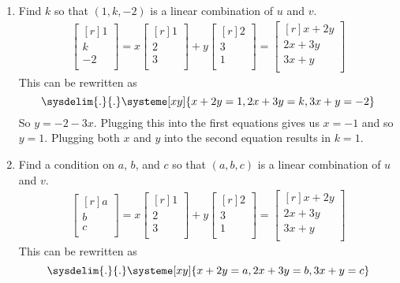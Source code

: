 \documentclass[12pt]{article}
\begin{document}
\begin{enumerate}
\begin{enumerate}
	\item Find $k$ so that $(1,k,-2)$ is a linear combination of $u$ and $v$.
		\begin{align*}
		\begin{bmatrix}[r]1\\k\\-2\\ \end{bmatrix}
		= x \begin{bmatrix}[r] 1\\2\\3\\ \end{bmatrix}
		+ y \begin{bmatrix}[r] 2\\3\\1\\ \end{bmatrix}
		= \begin{bmatrix}[r] x+2y\\ 2x+3y\\ 3x+y\\ \end{bmatrix}
		\end{align*}
		This can be rewritten as
		\[ \sysdelim{.}{.}\systeme[xy]{x+2y=1,2x+3y=k,3x+y=-2} \]
		So $y=-2-3x$. Plugging this into the first equations gives us $x=-1$ and so $y=1$. Plugging both $x$ and $y$ into the second equation results in $k=1$.		
		
	\item Find a condition on $a$, $b$, and $c$ so that $(a,b,c)$ is a linear combination of $u$ and $v$.
		\begin{align*}
		\begin{bmatrix}[r]a\\b\\c\\ \end{bmatrix}
		= x \begin{bmatrix}[r] 1\\2\\3\\ \end{bmatrix}
		+ y \begin{bmatrix}[r] 2\\3\\1\\ \end{bmatrix}
		= \begin{bmatrix}[r] x+2y\\ 2x+3y\\ 3x+y\\ \end{bmatrix}
		\end{align*}
		This can be rewritten as
		\[ \sysdelim{.}{.}\systeme[xy]{x+2y=a,2x+3y=b,3x+y=c} \]
		

\end{enumerate}
\end{enumerate}
\end{document}
